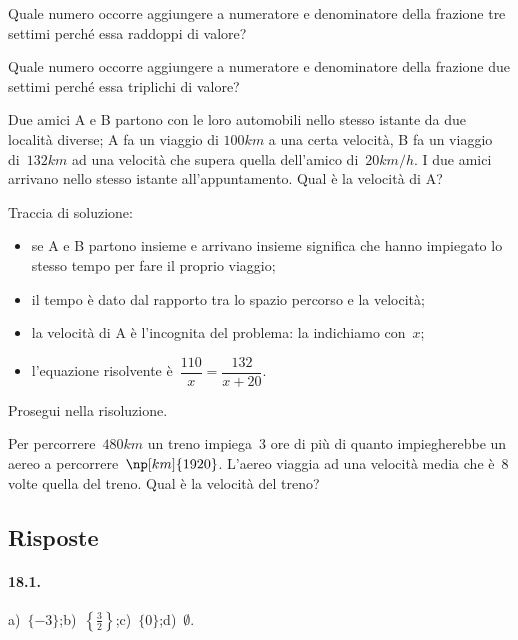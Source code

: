 \begin{esercizio}[\Ast]
\label{ese:18.20}
Quale numero occorre aggiungere a numeratore e denominatore della frazione tre settimi perché essa raddoppi di valore?
\end{esercizio}

\begin{esercizio}[\Ast]
\label{ese:18.21}
Quale numero occorre aggiungere a numeratore e denominatore della frazione due settimi perché essa triplichi di valore?
\end{esercizio}

\begin{esercizio}
\label{ese:18.22}
Due amici A e B partono con le loro automobili nello stesso istante da due località diverse; A fa un viaggio di
$100\unit{km}$ a una certa velocità, B fa un viaggio di~$132\unit{km}$ ad una velocità che supera quella dell'amico di~$20\unit{km/h}$.
I due amici arrivano nello stesso istante all'appuntamento. Qual è la velocità di A?
\begin{center}
 
\end{center}
Traccia di soluzione:
\begin{itemize}
 \item se A e B partono insieme e arrivano insieme significa che hanno impiegato lo stesso tempo per fare il proprio viaggio;
 \item il tempo è dato dal rapporto tra lo spazio percorso e la velocità;
 \item la velocità di A è l'incognita del problema: la indichiamo con~$x$;
 \item l'equazione risolvente è~$\dfrac{110}{x}=\dfrac{132}{x+20}$.
\end{itemize}
Prosegui nella risoluzione.
\end{esercizio}

\begin{esercizio}
\label{ese:18.23}
Per percorrere~$480\unit{km}$ un treno impiega~$3$ ore di più di quanto impiegherebbe un aereo a percorrere~$\np[km]{1920}$.
L'aereo viaggia ad una velocità media che è~$8$ volte quella del treno. Qual è la velocità del treno?
\end{esercizio}
\newpage
\subsection{Risposte}

\paragraph{18.1.}
a)~$\{-3\}$;\quad b)~$\left\{\frac{3}{2}\right\}$;\quad c)~$\{0\}$;\quad d)~$\emptyset$.

